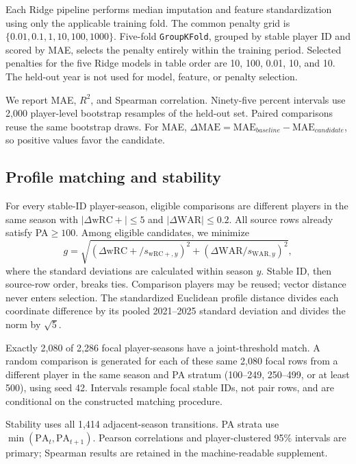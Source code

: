 \documentclass[10pt,twocolumn,letterpaper]{article}
\begin{document}
Each Ridge pipeline performs median imputation and feature standardization using only the applicable training fold. The common penalty grid is $\{0.01,0.1,1,10,100,1000\}$. Five-fold \texttt{GroupKFold}, grouped by stable player ID and scored by MAE, selects the penalty entirely within the training period. Selected penalties for the five Ridge models in table order are 10, 100, 0.01, 10, and 10. The held-out year is not used for model, feature, or penalty selection.

We report MAE, $R^2$, and Spearman correlation. Ninety-five percent intervals use 2,000 player-level bootstrap resamples of the held-out set. Paired comparisons reuse the same bootstrap draws. For MAE, $\Delta\mathrm{MAE}=\mathrm{MAE}_{baseline}-\mathrm{MAE}_{candidate}$, so positive values favor the candidate.

\subsection{Profile matching and stability}
For every stable-ID player-season, eligible comparisons are different players in the same season with $|\Delta\mathrm{wRC+}|\leq5$ and $|\Delta\mathrm{WAR}|\leq0.2$. All source rows already satisfy PA$\geq100$. Among eligible candidates, we minimize
\begin{equation}
g=\sqrt{(\Delta\mathrm{wRC+}/s_{\mathrm{wRC+},y})^2+(\Delta\mathrm{WAR}/s_{\mathrm{WAR},y})^2},
\end{equation}
where the standard deviations are calculated within season $y$. Stable ID, then source-row order, breaks ties. Comparison players may be reused; vector distance never enters selection. The standardized Euclidean profile distance divides each coordinate difference by its pooled 2021--2025 standard deviation and divides the norm by $\sqrt{5}$.

Exactly 2,080 of 2,286 focal player-seasons have a joint-threshold match. A random comparison is generated for each of these same 2,080 focal rows from a different player in the same season and PA stratum (100--249, 250--499, or at least 500), using seed 42. Intervals resample focal stable IDs, not pair rows, and are conditional on the constructed matching procedure.

Stability uses all 1,414 adjacent-season transitions. PA strata use $\min(\mathrm{PA}_t,\mathrm{PA}_{t+1})$. Pearson correlations and player-clustered 95\% intervals are primary; Spearman results are retained in the machine-readable supplement.
\end{document}
